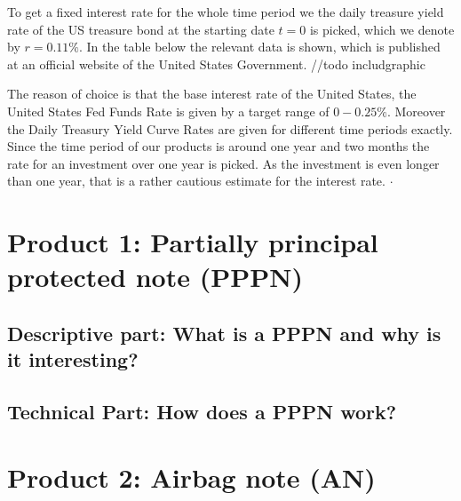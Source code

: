 \documentclass[11pt,oneside,a4paper]{article}
\begin{document}



	To get a fixed interest rate for the whole time period we the daily treasure yield rate of the US treasure bond at the starting date $ t=0 $ is picked, which we denote by $ r = 0.11 \% $.
	In the table below the relevant data is shown, which is published at \cite{site_treasure}
    an official website of the United States Government.
	//todo includgraphic 
	
	The reason of choice is that the base interest rate of the United States, the United States Fed Funds Rate is given by a target range of $ 0-0.25 \% $. Moreover the Daily Treasury Yield Curve Rates are given for different time periods exactly. Since the time period of our products is around one year and two months the rate for an investment over one year is picked. As the investment is even longer than one year, that is a rather cautious estimate for the interest rate.
	$\cdot$
	\newpage
	\section{Product 1: Partially principal protected note (PPPN)}
	\subsection{Descriptive part: What is a PPPN and why is it interesting?}
	\subsection{Technical Part: How does a PPPN work?}
	\newpage
	\section{Product 2: Airbag note (AN)}
\end{document}
